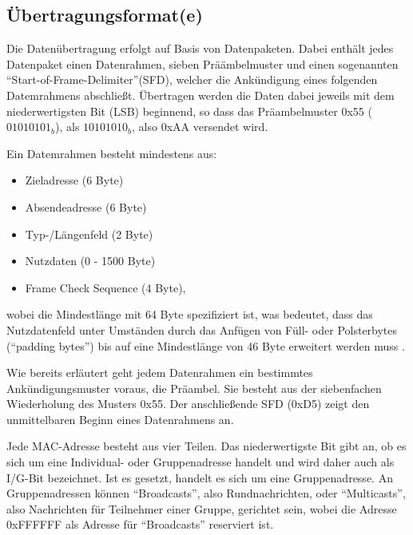 \subsection{Übertragungsformat(e)}
\label{sec:grundlagen_ethernet_datenrahmen}
Die Datenübertragung erfolgt auf Basis von Datenpaketen. Dabei enthält
jedes Datenpaket einen Datenrahmen, sieben Präämbelmuster und einen
sogenannten ``Start-of-Frame-Delimiter''(SFD), welcher die Ankündigung
eines folgenden Datemrahmens abschließt. Übertragen werden die Daten
dabei jeweils mit dem niederwertigsten Bit (LSB) beginnend, so dass
das Präambelmuster 0x55 ($01010101_b$), als $10101010_b$, also 0xAA
versendet wird.

Ein Datemrahmen besteht mindestens aus:
\begin{itemize}
\item Zieladresse (6 Byte)
\item Absendeadresse (6 Byte)
\item Typ-/Längenfeld (2 Byte)
\item Nutzdaten (0 - 1500 Byte)
\item Frame Check Sequence (4 Byte),
\end{itemize}

wobei die Mindestlänge mit 64 Byte spezifiziert ist, was
bedeutet, dass das Nutzdatenfeld unter Umständen durch das Anfügen von
Füll- oder Polsterbytes (``padding bytes'') bis auf eine Mindestlänge
von 46 Byte erweitert werden muss \cite[S. 76]{rech2008}.

Wie bereits erläutert geht jedem Datenrahmen ein bestimmtes
Ankündigungsmuster voraus, die Präambel. Sie besteht aus der
siebenfachen Wiederholung des Musters 0x55. Der anschließende SFD
(0xD5) zeigt den unmittelbaren Beginn eines Datenrahmens an.

Jede MAC-Adresse besteht aus vier Teilen. Das niederwertigste Bit gibt
an, ob es sich um eine Individual- oder Gruppenadresse handelt und wird
daher auch als I/G-Bit bezeichnet. Ist es gesetzt, handelt es sich um
eine Gruppenadresse. An Gruppenadressen können "`Broadcasts"', also Rundnachrichten, oder "`Multicasts"', also Nachrichten für Teilnehmer einer Gruppe, gerichtet sein, wobei die Adresse 0xFFFFFF als Adresse für "`Broadcasts"' reserviert ist.


